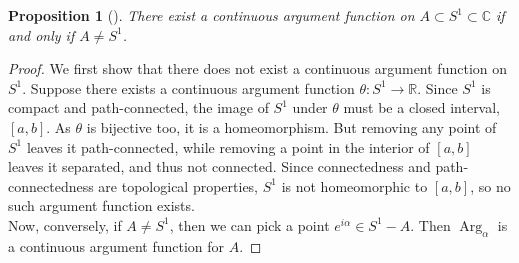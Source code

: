 \documentclass[reqno]{amsart}
\theoremstyle{plain}%
\newtheorem{proposition}[theorem]{Proposition}
\theoremstyle{definition}
\theoremstyle{remark}
\DeclareMathOperator{\Arg}{Arg}
\begin{document}
    \begin{proposition}[]
        There exist a continuous argument function on
        $ A \subset S^{1} \subset \mathbb{C}$ if and only if
        $A \neq S^{1}$.
    \end{proposition}
    
    \begin{proof}
        We first show that there does not exist a continuous argument function
        on $S^{1}$. Suppose there exists a continuous argument function
        $\theta  \colon S^{1} \to \mathbb{R}$. Since
        $S^{1}$ is compact and path-connected, 
        the image of $S^{1}$ under $\theta$ must be a closed interval, $\left[
        a,b\right] $. As $\theta$ is bijective too, it is a homeomorphism. But
        removing any point of $S^{1}$ leaves it path-connected, while removing
        a point in the interior of $\left[ a,b \right] $ leaves it separated,
        and thus not connected. Since connectedness and path-connectedness are
        topological properties, $S^{1}$ is not homeomorphic to $\left[ a,b
        \right] $, so no such argument function exists.\\
        Now, conversely, if $A \neq S^{1}$, then we can pick a point
        $e^{i \alpha} \in S^{1} - A$. Then
        $\Arg_{\alpha}$ is a continuous argument function for $A$.
    \end{proof}


%
\end{document}
